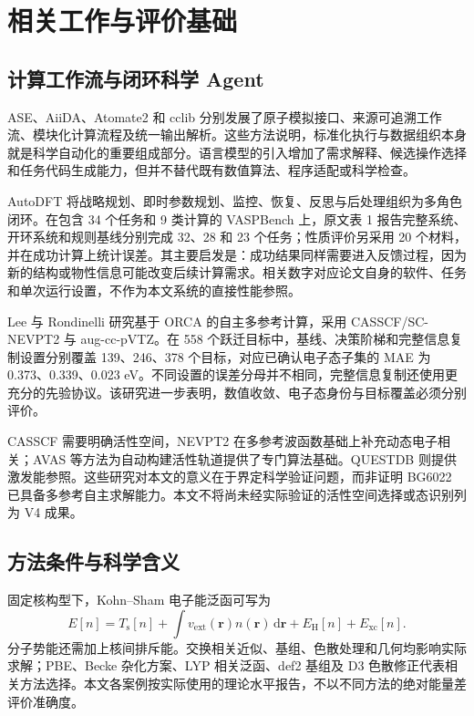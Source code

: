 \section{相关工作与评价基础}
\subsection{计算工作流与闭环科学 Agent}
ASE、AiiDA、Atomate2 和 cclib 分别发展了原子模拟接口、来源可追溯工作流、模块化计算流程及统一输出解析\cite{ase,aiida,atomate2,cclib}。这些方法说明，标准化执行与数据组织本身就是科学自动化的重要组成部分。语言模型的引入增加了需求解释、候选操作选择和任务代码生成能力，但并不替代既有数值算法、程序适配或科学检查。

AutoDFT 将战略规划、即时参数规划、监控、恢复、反思与后处理组织为多角色闭环。在包含 34 个任务和 9 类计算的 VASPBench 上，原文表 1 报告完整系统、开环系统和规则基线分别完成 32、28 和 23 个任务；性质评价另采用 20 个材料，并在成功计算上统计误差\cite{autodft}。其主要启发是：成功结果同样需要进入反馈过程，因为新的结构或物性信息可能改变后续计算需求。相关数字对应论文自身的软件、任务和单次运行设置，不作为本文系统的直接性能参照。

Lee 与 Rondinelli 研究基于 ORCA 的自主多参考计算，采用 CASSCF/SC-NEVPT2 与 aug-cc-pVTZ。在 558 个跃迁目标中，基线、决策阶梯和完整信息复制设置分别覆盖 139、246、378 个目标，对应已确认电子态子集的 MAE 为 0.373、0.339、0.023 eV\cite{multirefagent}。不同设置的误差分母并不相同，完整信息复制还使用更充分的先验协议。该研究进一步表明，数值收敛、电子态身份与目标覆盖必须分别评价。

CASSCF 需要明确活性空间，NEVPT2 在多参考波函数基础上补充动态电子相关\cite{casscf,nevpt2}；AVAS 等方法为自动构建活性轨道提供了专门算法基础\cite{avas}。QUESTDB 则提供激发能参照\cite{questdb}。这些研究对本文的意义在于界定科学验证问题，而非证明 BG6022 已具备多参考自主求解能力。本文不将尚未经实际验证的活性空间选择或态识别列为 V4 成果。

\subsection{方法条件与科学含义}
固定核构型下，Kohn--Sham 电子能泛函可写为
\begin{equation}
E[n]=T_{\mathrm s}[n]+\int v_{\mathrm{ext}}(\bm r)n(\bm r)\,\mathrm d\bm r
+E_{\mathrm H}[n]+E_{\mathrm{xc}}[n].
\end{equation}
分子势能还需加上核间排斥能。交换相关近似、基组、色散处理和几何均影响实际求解；PBE、Becke 杂化方案、LYP 相关泛函、def2 基组及 D3 色散修正代表相关方法选择\cite{pbe,becke,lyp,def2,d3}。本文各案例按实际使用的理论水平报告，不以不同方法的绝对能量差评价准确度。

